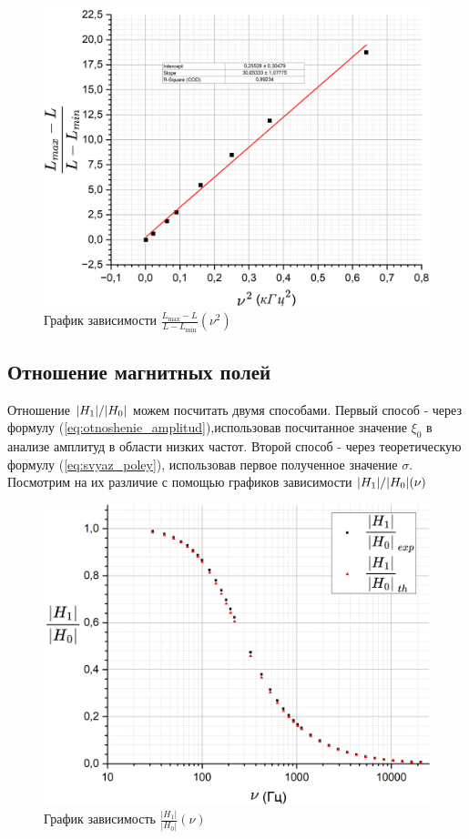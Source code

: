 \documentclass[a4paper, 12pt]{article}
\begin{document}
	\begin{figure}[h!]
		\centering
		\includegraphics[width=\textwidth]{L_linear}
		\caption{График зависимости $\frac{L_{\max} - L}{L - L_{\min}} (\nu^2)$}
	\end{figure}
	
	
	\subsection*{Отношение магнитных полей}
	Отношение $\abs{H_1}/\abs{H_0}$ можем посчитать двумя способами. Первый способ - через
	формулу (\ref{eq:otnoshenie_amplitud}),использовав посчитанное значение $\xi_0$ в анализе амплитуд в области низких частот.
	Второй способ - через теоретическую формулу (\ref{eq:svyaz_poley}), использовав первое полученное значение $\sigma$. Посмотрим на их различие с помощью графиков зависимости
	$\abs{H_1}/\abs{H_0} (\nu)$
	
	\begin{figure}[h]
		\centering
		\includegraphics[width=\textwidth]{Final}
		\caption{График зависимость $\frac{|H_1|}{|H_0|}(\nu)$}
	\end{figure}
	
\end{document}
